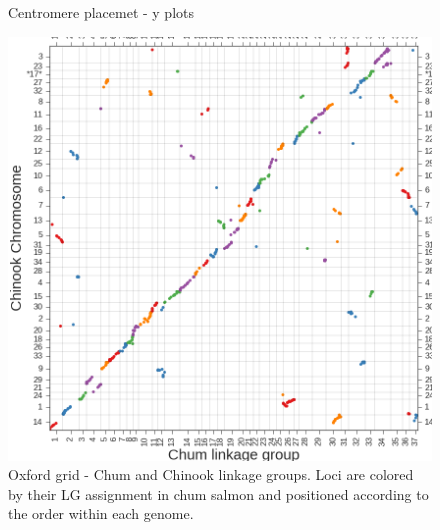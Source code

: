 \documentclass[12pt, one column]{article}
\begin{document}
\begin{figure}[H]
\caption[SUPPLEMENTAL - Centromere placemet - y plots]{ Centromere placemet - y plots}
\end{figure}

\begin{figure}[H]
\includegraphics[scale=.35]{figures/supplemental/synteny_chinook.png}
\caption[SUPPLEMENTAL - Chum / Chinook Oxford grid]{Oxford grid - Chum and Chinook linkage groups. Loci are colored by their LG assignment in chum salmon and positioned according to the order within each genome.}
\end{figure}
\end{document}
